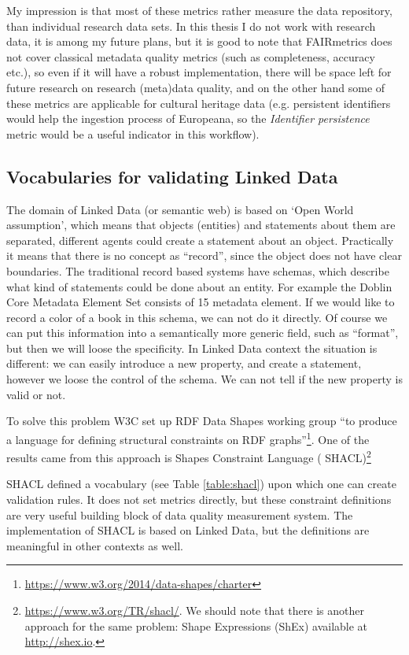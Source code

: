 My impression is that most of these metrics rather measure the data repository, than individual research data sets. In this thesis I do not work with research data, it is among my future plans, but it is good to note that FAIRmetrics does not cover classical metadata quality metrics (such as completeness, accuracy etc.), so even if it will have a robust implementation, there will be space left for future research on research (meta)data quality, and on the other hand some of these metrics are applicable for cultural heritage data (e.g. persistent identifiers would help the ingestion process of Europeana, so the \emph{Identifier persistence} metric would be a useful indicator in this workflow).

\subsection{Vocabularies for validating Linked Data}

The domain of Linked Data (or semantic web) is based on `Open World assumption', which means that objects (entities) and statements about them are separated, different agents could create a statement about an object. Practically it means that there is no concept as ``record'', since the object does not have clear boundaries. The traditional record based systems have schemas, which describe what kind of statements could be done about an entity. For example the Doblin Core Metadata Element Set consists of 15 metadata element. If we would like to record a color of a book in this schema, we can not do it directly. Of course we can put this information into a semantically more generic field, such as ``format'', but then we will loose the specificity. In Linked Data context the situation is different: we can easily introduce a new property, and create a statement, however we loose the control of the schema. We can not tell if the new property is valid or not.

To solve this problem W3C set up RDF Data Shapes working group ``to produce a language for defining structural constraints on RDF graphs''\footnote{\url{https://www.w3.org/2014/data-shapes/charter}}. One of the results came from this approach is Shapes Constraint Language ( SHACL)\footnote{\url{https://www.w3.org/TR/shacl/}. We should note that there is another approach for the same problem: Shape Expressions (ShEx) available at \url{http://shex.io}.}

SHACL defined a vocabulary (see Table \ref{table:shacl}) upon which one can create validation rules. It does not set metrics directly, but these constraint definitions are very useful building block of data quality measurement system. The implementation of SHACL is based on Linked Data, but the definitions are meaningful in other contexts as well.

